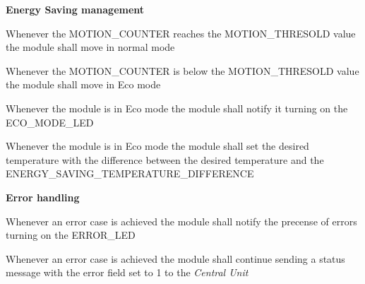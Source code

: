 \begin{req_enum}
	\item \textbf{Energy Saving management}
		\begin{req_enum}[label*=\arabic*.]
			\item Whenever the MOTION\_COUNTER reaches the MOTION\_THRESOLD value the module shall move in normal mode
			\item Whenever the MOTION\_COUNTER is below the MOTION\_THRESOLD value the module shall move in Eco mode
			\item Whenever the module is in Eco mode the module shall notify it turning on the ECO\_MODE\_LED
			\item Whenever the module is in Eco mode the module shall set the desired temperature with the difference between the desired temperature and the ENERGY\_SAVING\_TEMPERATURE\_DIFFERENCE
		\end{req_enum}

		\item \textbf{Error handling}
		\begin{req_enum}[label*=\arabic*.]
			\item Whenever an error case is achieved the module shall notify the precense of errors turning on the ERROR\_LED
			\item Whenever an error case is achieved the module shall continue sending a status message with the error field set to 1 to the \textit{Central Unit}
		\end{req_enum}

\end{req_enum}

